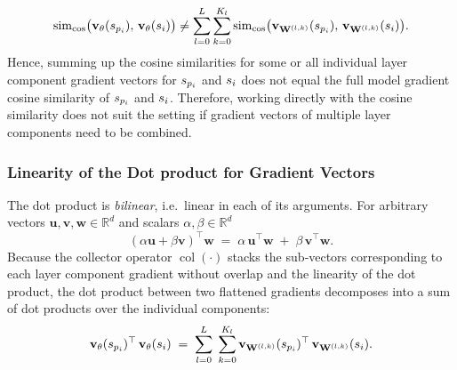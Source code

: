 \begin{equation}
\begin{split}
    \simcos\bigl(\vXspi,\,\vXsi\bigr) \neq \sum_{l=0}^{L} \sum_{k=0}^{K_l} \simcos\bigl( \vXspi[\Wlk], \, \vXsi[\Wlk] \bigr ).
    \label{eq:cosine_similarity_non_linearity_full}
\end{split}
\end{equation}
Hence, summing up the cosine similarities for some or all individual layer component gradient vectors for $s_{p_i}$ and $s_i$ does not equal the full model gradient cosine similarity of $s_{p_i}$ and $s_i$. Therefore, working directly with the cosine similarity does not suit the setting if gradient vectors of multiple layer components need to be combined. 

\subsubsection{Linearity of the Dot product for Gradient Vectors}
The dot product is \emph{bilinear}, i.e.\ linear in each of its arguments.
For arbitrary vectors $\mathbf{u},\mathbf{v},\mathbf{w}\in\mathbb{R}^d$ and
scalars $\alpha,\beta\in\mathbb{R}^d$
\begin{equation}
  (\alpha\mathbf{u}+\beta\mathbf{v})^{\top}\mathbf{w}
  \;=\;
  \alpha\,\mathbf{u}^{\top}\mathbf{w}
  \;+\;
  \beta\,\mathbf{v}^{\top}\mathbf{w}.
  \label{eq:dot_bilinear}
\end{equation}
Because the collector operator $\operatorname{col}(\cdot)$ stacks the sub‑vectors corresponding to each layer component gradient without overlap and the linearity of the dot product, the dot product between two flattened gradients decomposes into a sum of dot products over the individual components:
\begin{equation}
  \vXspi^{\top}\,\vXsi
  \;=\;
  \sum_{l=0}^{L}\;
  \sum_{k=0}^{K_l}
    \vXspi[\Wlk]^{\top}\,
    \vXsi[\Wlk].
  \label{eq:dot_grad_decompose}
\end{equation}

